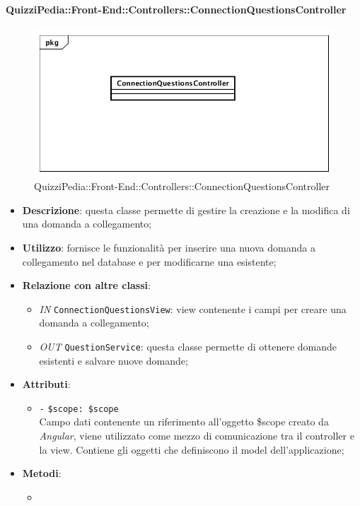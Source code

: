 \paragraph{QuizziPedia::Front-End::Controllers::ConnectionQuestionsController}
\begin{figure}
	\centering
	\includegraphics[scale=0.45]{UML/Classi/Front-End/QuizziPedia_Front-end_Controller_ConnectionQuestionsController.png}
	\caption{QuizziPedia::Front-End::Controllers::ConnectionQuestionsController}
\end{figure}
\begin{itemize}
	\item \textbf{Descrizione}: questa classe permette di gestire la creazione e la modifica di una domanda a collegamento;
	\item \textbf{Utilizzo}: fornisce le funzionalità per inserire una nuova domanda a collegamento nel database e per modificarne una esistente;
	\item \textbf{Relazione con altre classi}:
	\begin{itemize}
		\item \textit{IN} \texttt{ConnectionQuestionsView}: view contenente i campi per creare una domanda a collegamento;  
		\item \textit{OUT} \texttt{QuestionService}: questa classe permette di ottenere domande esistenti e salvare nuove domande;
	\end{itemize}
	\item \textbf{Attributi}:
	\begin{itemize}
		\item \texttt{-} \texttt{\$scope: \$scope} \\
		Campo dati contenente un riferimento all’oggetto \$scope creato da \textit{Angular}, viene utilizzato come mezzo di comunicazione tra il controller e la view. Contiene gli oggetti che definiscono il model dell’applicazione;
	\end{itemize}
	\item \textbf{Metodi}:
	\begin{itemize}
		\item 
	\end{itemize}
\end{itemize}

